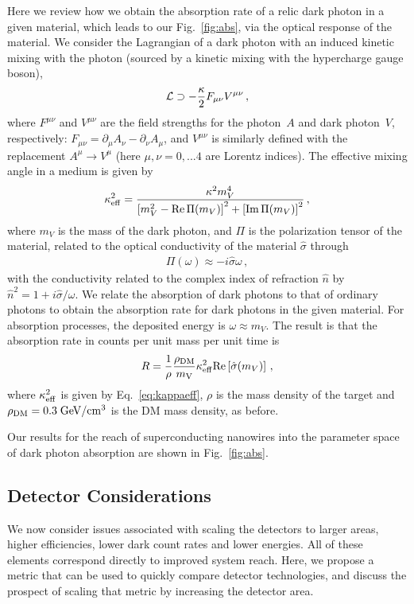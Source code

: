 \documentclass[twocolumn,10pt,prl,nofootinbib,preprintnumbers]{revtex4-1}
\newcommand{\beq}{\begin{eqnarray}}%
\newcommand{\eeq}{\end{eqnarray}}
\begin{document}
Here we review how we obtain the absorption rate of a relic dark
photon in a given material, which leads to our
Fig.~\ref{fig:abs}, via the optical response of the material. We
consider the Lagrangian of a dark photon with an induced kinetic mixing with the photon
(sourced by a kinetic mixing with the hypercharge gauge boson),
\beq\label{eq:LHidden} {\cal L}\supset -\frac{\kappa}{2}
F_{\mu\nu}V^{\mu\nu}\,, \eeq
%
where $F^{\mu\nu}$ and $V^{\mu\nu}$ are the field strengths for the
photon~$A$ and dark photon~$V$, respectively: $F_{\mu\nu}=\partial_\mu A_\nu-\partial_\nu A_\mu$, and $V^{\mu\nu}$ is similarly defined with the replacement $A^\mu \to V^\mu$ (here $\mu, \nu=0,...4$ are Lorentz indices). The effective mixing angle in a
medium is given by
%
\beq\label{eq:kappaeff}
\kappa_{\rm eff}^2 =\frac{\kappa^2 m_V^4}{\left[m_V^2-{\rm Re}\,\Pi(m_V)\right]^2+\left[{\rm Im}\, \Pi(m_V)\right]^2}\,,
\eeq
%
where $m_V$ is the mass of the dark photon, and 
 $\Pi$ is the polarization tensor of the material,
related to the optical conductivity of the material $\hat \sigma$ through
\beq\label{eq:pisig}
\Pi(\omega)\approx - i \hat \sigma \omega\,,
\eeq
%
with the conductivity related to the complex index of refraction
$\hat n$ by $\hat n^2 = 1 + i \hat \sigma/\omega$.  We relate the
absorption of dark photons to that of ordinary photons to obtain the
absorption rate for dark photons in the given material. For absorption
processes, the deposited energy is $\omega\approx m_V$.  The result is that the absorption
rate in counts per unit mass per unit time is %
\beq\label{eq:rateHidden} R=\frac{1}{\rho}\frac{\rho_{\rm DM}}{m_{\rm
    V}}\kappa_{\rm eff}^2 {\rm Re}\left[\hat \sigma(m_V)\right]\,, \eeq
%
where $\kappa_{\rm eff}^2$ is given by Eq.~\eqref{eq:kappaeff},  $\rho$ is the mass density of the target and
$\rho_{\rm DM}=0.3\;{\rm GeV}/{\rm cm}^3$ is the DM mass density, as
before.

Our results for the reach of superconducting nanowires into the
parameter space of dark photon absorption are shown in
Fig.~\ref{fig:abs}.

\subsection{Detector Considerations}

We now consider issues associated with scaling the
detectors to larger areas, higher efficiencies, lower dark count
rates and lower energies.  All of these elements correspond directly
to improved system reach. Here, we propose a metric that can be used to
quickly compare detector technologies, and discuss the prospect of
scaling that metric by increasing the detector area.
\end{document}
